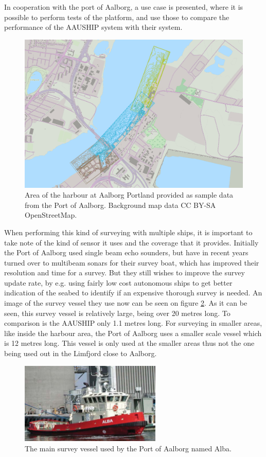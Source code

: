 In cooperation with the port of Aalborg, a use case is presented, where it is possible to perform tests of the platform, and use those to compare the performance of the AAUSHIP system with their system.
\begin{figure}[htbp]
	\centering
	\includegraphics[width=\textwidth]{fig/use-case-data}
	\caption{Area of the harbour at Aalborg Portland provided as sample
	data from the Port of Aalborg. Background map data CC BY-SA OpenStreetMap.}
	\label{fig:diffforms}
\end{figure}

When performing this kind of surveying with multiple ships, it is important to take note of the kind of sensor it uses and the coverage that it provides. Initially the Port of Aalborg used single beam echo sounders, but have in recent years turned over to multibeam sonars for their survey boat, which has improved their resolution and time for a survey. But they still wishes to improve the survey update rate, by e.g. using fairly low cost autonomous ships to get better indication of the seabed to identify if an expensive thorough survey is needed. An image of the survey vessel they use now can be seen on figure \ref{fig:alba}. As it can be seen, this survey vessel is relatively large, being over 20 metres long. To comparison is the AAUSHIP only 1.1 metres long. For surveying in smaller areas, like inside the harbour area, the Port of Aalborg uses a smaller scale vessel which is 12 metres long. This vessel is only used at the smaller areas thus not the one being used out in the Limfjord close to Aalborg.
\begin{figure}
	\centering
	\includegraphics[width=0.6\textwidth]{fig/alba}
	\caption{The main survey vessel used by the Port of Aalborg named Alba.}
	\label{fig:alba}
\end{figure}



